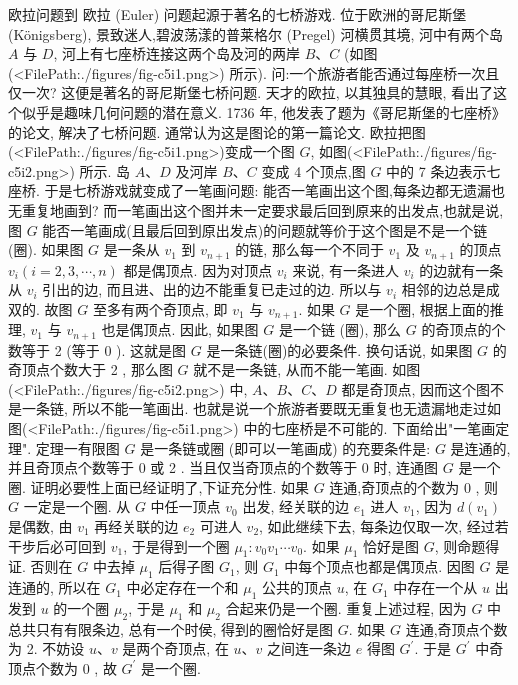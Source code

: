 
欧拉问题到
欧拉 (Euler) 问题起源于著名的七桥游戏.
位于欧洲的哥尼斯堡 (Königsberg), 景致迷人,碧波荡漾的普莱格尔 (Pregel) 河横贯其境, 河中有两个岛 $A$ 与 $D$, 河上有七座桥连接这两个岛及河的两岸 $B 、 C$ (如图(<FilePath:./figures/fig-c5i1.png>) 所示).
问:一个旅游者能否通过每座桥一次且仅一次?
这便是著名的哥尼斯堡七桥问题.
天才的欧拉, 以其独具的慧眼, 看出了这个似乎是趣味几何问题的潜在意义.
1736 年, 他发表了题为《哥尼斯堡的七座桥》的论文, 解决了七桥问题.
通常认为这是图论的第一篇论文.
欧拉把图(<FilePath:./figures/fig-c5i1.png>)变成一个图 $G$, 如图(<FilePath:./figures/fig-c5i2.png>) 所示.
岛 $A 、 D$ 及河岸 $B 、 C$ 变成 4 个顶点,图 $G$ 中的 7 条边表示七座桥.
于是七桥游戏就变成了一笔画问题: 能否一笔画出这个图,每条边都无遗漏也无重复地画到? 而一笔画出这个图并未一定要求最后回到原来的出发点,也就是说, 图 $G$ 能否一笔画成(且最后回到原出发点)的问题就等价于这个图是不是一个链(圈).
如果图 $G$ 是一条从 $v_1$ 到 $v_{n+1}$ 的链, 那么每一个不同于 $v_1$ 及 $v_{n+1}$ 的顶点 $v_i(i=2,3, \cdots, n)$ 都是偶顶点.
因为对顶点 $v_i$ 来说, 有一条进人 $v_i$ 的边就有一条从 $v_i$ 引出的边, 而且进、出的边不能重复已走过的边.
所以与 $v_i$ 相邻的边总是成双的.
故图 $G$ 至多有两个奇顶点, 即 $v_1$ 与 $v_{n+1}$. 如果 $G$ 是一个圈, 根据上面的推理, $v_1$ 与 $v_{n+1}$ 也是偶顶点.
因此, 如果图 $G$ 是一个链 (圈), 那么 $G$ 的奇顶点的个数等于 2 (等于 0 ). 这就是图 $G$ 是一条链(圈)的必要条件.
换句话说, 如果图 $G$ 的奇顶点个数大于 2 , 那么图 $G$ 就不是一条链, 从而不能一笔画.
如图(<FilePath:./figures/fig-c5i2.png>) 中, $A 、 B 、 C 、 D$ 都是奇顶点, 因而这个图不是一条链, 所以不能一笔画出.
也就是说一个旅游者要既无重复也无遗漏地走过如图(<FilePath:./figures/fig-c5i1.png>) 中的七座桥是不可能的.
下面给出"一笔画定理".
定理一有限图 $G$ 是一条链或圈 (即可以一笔画成) 的充要条件是: $G$ 是连通的, 并且奇顶点个数等于 0 或 2 . 当且仅当奇顶点的个数等于 0 时, 连通图 $G$ 是一个圈.
证明必要性上面已经证明了,下证充分性.
如果 $G$ 连通,奇顶点的个数为 0 , 则 $G$ 一定是一个圈.
从 $G$ 中任一顶点 $v_0$ 出发, 经关联的边 $e_1$ 进人 $v_1$, 因为 $d\left(v_1\right)$ 是偶数, 由 $v_1$ 再经关联的边 $e_2$ 可进人 $v_2$, 如此继续下去, 每条边仅取一次, 经过若干步后必可回到 $v_1$, 于是得到一个圈 $\mu_1: v_0 v_1 \cdots v_0$.
如果 $\mu_1$ 恰好是图 $G$, 则命题得证.
否则在 $G$ 中去掉 $\mu_1$ 后得子图 $G_1$, 则 $G_1$ 中每个顶点也都是偶顶点.
因图 $G$ 是连通的, 所以在 $G_1$ 中必定存在一个和 $\mu_1$ 公共的顶点 $u$, 在 $G_1$ 中存在一个从 $u$ 出发到 $u$ 的一个圈 $\mu_2$, 于是 $\mu_1$ 和 $\mu_2$ 合起来仍是一个圈.
重复上述过程, 因为 $G$ 中总共只有有限条边, 总有一个时侯, 得到的圈恰好是图 $G$.
如果 $G$ 连通,奇顶点个数为 2. 不妨设 $u 、 v$ 是两个奇顶点, 在 $u 、 v$ 之间连一条边 $e$ 得图 $G^{\prime}$. 于是 $G^{\prime}$ 中奇顶点个数为 0 , 故 $G^{\prime}$ 是一个圈.
